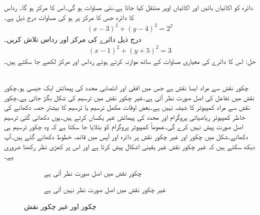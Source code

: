 دائرہ  کو  اکائیاں بائیں اور  اکائیاں اوپر منتقل کیا جاتا ہے۔نئی مساوات  ہو گی۔اس کا مرکز  ہو گا۔
رداس  کا دائرہ جس کا مرکز   پر ہو کی مساوات درج ذیل ہے۔
\begin{align*}
(x-3)^2+(y-4)^2=2^2
\end{align*}
درج ذیل دائرے کی مرکز  اور رداس تلاش کریں۔
\begin{align*}
(x-1)^2+(y+5)^2=3
\end{align*}
حل:\quad
اس کا دائرے کی معیاری مساوات کے ساتھ موازنہ کرتے ہوئے رداس  اور مرکز  لکھے جا سکتے ہیں۔  

 \quad {}\\
چکور نقش سے مراد ایسا نقش ہے جس میں افقی اور انتصابی محدد کی پیمائش ایک جیسی ہو۔چکور نقش میں تفاعل کی اصل صورت نظر آتی ہے۔غیر چکور نقش میں ترسیم کی شکل بگڑ جاتی ہے۔چکور نقش سے مراد کمپیوٹر کا شیشہ نہیں ہے۔بعض اوقات مکمل ترسیم یا ترسیم کا بیشتر حصہ دکھانے کی خاطر کمپیوٹر ریاضیاتی پروگرام  اور  محدد کی پیمائش غیر یکساں کرتے ہیں۔یوں دکھائی گئی ترسیم اصل صورت پیش نہیں کرے گی۔عموماً کمپیوٹر پروگرام کو بتلایا جا سکتا ہے کہ وہ چکور ترسیم ہی دکھائے۔شکل  میں چکور اور غیر چکور نقش پر دائرہ اور آپس میں قائمہ خطوط  دکھائے گئے ہیں۔آپ دیکھ سکتے ہیں کہ غیر چکور نقش غیر یقینی اشکال پیش کرتا ہے اور اس پر کھڑی نظر رکھنا ضروری ہے۔
\begin{figure}
\centering
\begin{subfigure}{0.5\textwidth}
\centering
{}
\caption{چکور نقش میں اصل صورت نظر آتی ہے}
\end{subfigure}%
\begin{subfigure}{0.5\textwidth}
\centering
{}
\caption{غیر چکور نقش میں اصل صورت نظر نہیں آتی ہے}
\end{subfigure}%
\caption{چکور اور غیر چکور نقش}
\label{شکل_ابتدا_چکور_غیر_چکر_نقش}
\end{figure}

